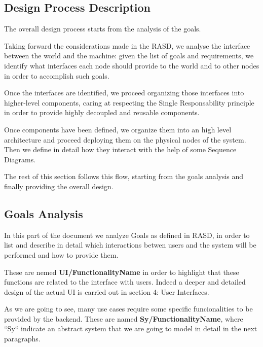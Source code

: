 \documentclass[11pt]{article} %
\begin{document}
\subsection{Design Process Description}

The overall design process starts from the analysis of the goals. 

Taking forward the considerations made in the RASD, we analyse the interface between the world and the machine: given the list of goals and requirements, we identify what interfaces each node should provide to the world and to other nodes in order to accomplish such goals.

Once the interfaces are identified, we proceed organizing those interfaces into higher-level components, caring at respecting the Single Responsability principle in order to provide highly decoupled and reusable components.

Once components have been defined, we organize them into an high level architecture and proceed deploying them on the physical nodes of the system. Then we define in detail how they interact with the help of some Sequence Diagrams.

The rest of this section follows this flow, starting from the goals analysis and finally providing the overall design.


\subsection{Goals Analysis}

In this part of the document we analyze Goals as defined in RASD, in order to list and describe in detail which interactions betwen users and the system will be performed and how to provide them. 

These are nemed \textbf{UI/FunctionalityName} in order to highlight that these functions are related to the interface with users. Indeed a deeper and detailed design of the actual UI is carried out in section 4: User Interfaces.

As we are going to see, many use cases require some specific funcionalities to be provided by the backend. These are named \textbf{Sy/FunctionalityName}, where ``Sy`` indicate an abstract system that we are going to model in detail in the next paragraphs.
\end{document}
